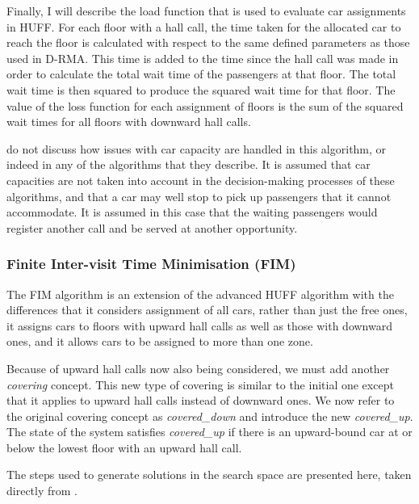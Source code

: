 \documentclass{UoYCSproject}
\begin{document}
Finally, I will describe the load function that is used to evaluate car assignments in HUFF.  For each floor with a hall call, the time taken for the allocated car to reach the floor is calculated with respect to the same defined parameters as those used in D-RMA.  This time is added to the time since the hall call was made in order to calculate the total wait time of the passengers at that floor.  The total wait time is then squared to produce the squared wait time for that floor.  The value of the loss function for each assignment of floors is the sum of the squared wait times for all floors with downward hall calls.

\citet{Bao1994} do not discuss how issues with car capacity are handled in this algorithm, or indeed in any of the algorithms that they describe.  It is assumed that car capacities are not taken into account in the decision-making processes of these algorithms, and that a car may well stop to pick up passengers that it cannot accommodate.  It is assumed in this case that the waiting passengers would register another call and be served at another opportunity.

\subsubsection{Finite Inter-visit Time Minimisation (FIM) \citep{Bao1994}}

The FIM algorithm is an extension of the advanced HUFF algorithm with the differences that it considers assignment of all cars, rather than just the free ones, it assigns cars to floors with upward hall calls as well as those with downward ones, and it allows cars to be assigned to more than one zone.

Because of upward hall calls now also being considered, we must add another \textit{covering} concept.  This new type of covering is similar to the initial one except that it applies to upward hall calls instead of downward ones.  We now refer to the original covering concept as \textit{covered\_down} and introduce the new \textit{covered\_up}.  The state of the system satisfies \textit{covered\_up} if there is an upward-bound car at or below the lowest floor with an upward hall call.

The steps used to generate solutions in the search space are presented here, taken directly from \citet{Bao1994}.
\end{document}
